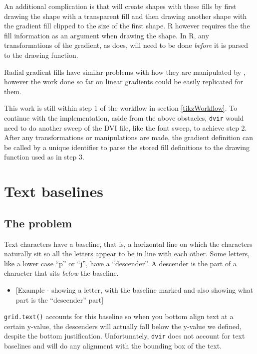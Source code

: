 \documentclass[]{article}
\providecommand{\tightlist}{%
  \setlength{\itemsep}{0pt}\setlength{\parskip}{0pt}}
\begin{document}
An additional complication is that \Tikz{} will create shapes with these
fills by first drawing the shape with a transparent fill and then
drawing another shape with the gradient fill clipped to the size of the
first shape. R however requires the the fill information as an argument
when drawing the shape. In R, any transformations of the gradient, as
\Tikz{} does, will need to be done \emph{before} it is parsed to the
drawing function.

Radial gradient fills have similar problems with how they are
manipulated by \Tikz{}, however the work done so far on linear gradients
could be easily replicated for them.

This work is still within step 1 of the workflow in section
\ref{tikzWorkflow}. To continue with the implementation, aside from the
above obstacles, \texttt{dvir} would need to do another sweep of the DVI
file, like the font sweep, to achieve step 2. After any transformations
or manipulations are made, the gradient definition can be called by a
unique identifier to parse the stored fill definitions to the drawing
function used as in step 3.

\newpage{}

\section{Text baselines}\label{text-baselines}

\newlength{\dviwidth} \newlength{\dvidepth} \setlength{\fboxsep}{0in}
\setlength{\parindent}{0in}

\subsection{The problem}\label{the-problem}

Text characters have a baseline, that is, a horizontal line on which the
characters naturally sit so all the letters appear to be in line with
each other. Some letters, like a lower case ``p'' or ``j'', have a
``descender''. A descender is the part of a character that sits
\emph{below} the baseline.

\begin{itemize}
\tightlist
\item
  {[}Example - showing a letter, with the baseline marked and also
  showing what part is the ``descender'' part{]}
\end{itemize}

\texttt{grid.text()} accounts for this baseline so when you bottom align
text at a certain y-value, the descenders will actually fall below the
y-value we defined, despite the bottom justification. Unfortunately,
\texttt{dvir} does not account for text baselines and will do any
alignment with the bounding box of the text.
\end{document}
